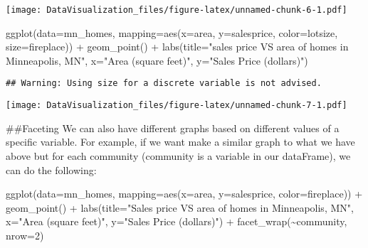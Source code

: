 \documentclass[
]{article}
\newenvironment{Shaded}{\begin{snugshade}}{\end{snugshade}}
\newcommand{\AttributeTok}[1]{\textcolor[rgb]{0.77,0.63,0.00}{#1}}
\newcommand{\DecValTok}[1]{\textcolor[rgb]{0.00,0.00,0.81}{#1}}
\newcommand{\FunctionTok}[1]{\textcolor[rgb]{0.00,0.00,0.00}{#1}}
\newcommand{\NormalTok}[1]{#1}
\newcommand{\SpecialCharTok}[1]{\textcolor[rgb]{0.00,0.00,0.00}{#1}}
\newcommand{\StringTok}[1]{\textcolor[rgb]{0.31,0.60,0.02}{#1}}
\begin{document}
\texttt{[image: DataVisualization\_files/figure-latex/unnamed-chunk-6-1.pdf]}

\begin{Shaded}
\begin{Highlighting}[]
\FunctionTok{ggplot}\NormalTok{(}\AttributeTok{data=}\NormalTok{mn\_homes, }\AttributeTok{mapping=}\FunctionTok{aes}\NormalTok{(}\AttributeTok{x=}\NormalTok{area, }\AttributeTok{y=}\NormalTok{salesprice, }\AttributeTok{color=}\NormalTok{lotsize, }\AttributeTok{size=}\NormalTok{fireplace)) }\SpecialCharTok{+} \FunctionTok{geom\_point}\NormalTok{() }\SpecialCharTok{+} \FunctionTok{labs}\NormalTok{(}\AttributeTok{title=}\StringTok{"sales price VS area of homes in Minneapolis, MN"}\NormalTok{, }\AttributeTok{x=}\StringTok{"Area (square feet)"}\NormalTok{, }\AttributeTok{y=}\StringTok{"Sales Price (dollars)"}\NormalTok{)}
\end{Highlighting}
\end{Shaded}

\begin{verbatim}
## Warning: Using size for a discrete variable is not advised.
\end{verbatim}

\texttt{[image: DataVisualization\_files/figure-latex/unnamed-chunk-7-1.pdf]}

\#\#Faceting We can also have different graphs based on different values
of a specific variable. For example, if we want make a similar graph to
what we have above but for each community (community is a variable in
our dataFrame), we can do the following:

\begin{Shaded}
\begin{Highlighting}[]
\FunctionTok{ggplot}\NormalTok{(}\AttributeTok{data=}\NormalTok{mn\_homes, }\AttributeTok{mapping=}\FunctionTok{aes}\NormalTok{(}\AttributeTok{x=}\NormalTok{area, }\AttributeTok{y=}\NormalTok{salesprice, }\AttributeTok{color=}\NormalTok{fireplace)) }\SpecialCharTok{+} \FunctionTok{geom\_point}\NormalTok{() }\SpecialCharTok{+} \FunctionTok{labs}\NormalTok{(}\AttributeTok{title=}\StringTok{"Sales price VS area of homes in Minneapolis, MN"}\NormalTok{, }\AttributeTok{x=}\StringTok{"Area (square feet)"}\NormalTok{, }\AttributeTok{y=}\StringTok{"Sales Price (dollars)"}\NormalTok{) }\SpecialCharTok{+} \FunctionTok{facet\_wrap}\NormalTok{(}\SpecialCharTok{\textasciitilde{}}\NormalTok{community, }\AttributeTok{nrow=}\DecValTok{2}\NormalTok{)}
\end{Highlighting}
\end{Shaded}
\end{document}
